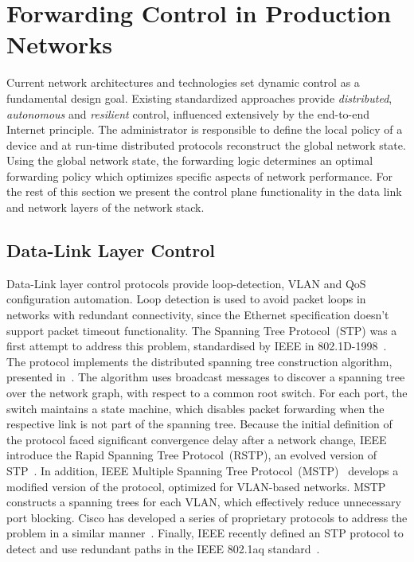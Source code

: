 \section{Forwarding Control in Production Networks} \label{sec:background:netcontrol}

Current network architectures and technologies set dynamic control as a
fundamental design goal.  Existing standardized approaches provide
\textit{distributed}, \textit{autonomous} and \textit{resilient} control,
influenced extensively by the end-to-end Internet principle. The administrator
is responsible to define the local policy of a device and at run-time
distributed protocols reconstruct the global network state.  Using the global
network state, the forwarding logic determines an optimal forwarding policy
which optimizes specific aspects of network performance.  For the rest of this
section we present the control plane functionality in the data link and network
layers of the network stack. 

\subsection{Data-Link Layer Control}

Data-Link layer control protocols provide loop-detection, VLAN and QoS
configuration automation. Loop detection is used to avoid packet loops in
networks with redundant connectivity, since the Ethernet specification doesn't
support packet timeout functionality.  The Spanning Tree Protocol~(STP) was a
first attempt to address this problem, standardised by IEEE in
802.1D-1998~. The protocol implements the distributed
spanning tree construction algorithm, presented in~. The
algorithm uses broadcast messages to discover a spanning tree over the network
graph, with respect to a common root switch. For each port, the switch maintains
a state machine, which disables packet forwarding when the respective link is
not part of the spanning tree.  Because the initial definition of the protocol
faced significant convergence delay after a network change, IEEE introduce the
Rapid Spanning Tree Protocol~(RSTP), an evolved version of
STP~.  In addition,  IEEE Multiple Spanning Tree
Protocol~(MSTP)~ develops a modified version of the protocol,
optimized for VLAN-based networks. MSTP constructs a spanning trees for each
VLAN, which effectively  reduce unnecessary port blocking. Cisco has developed a
series of proprietary protocols to address the problem in a similar
manner~.  Finally, IEEE recently defined an STP protocol to
detect and use redundant paths in the IEEE 802.1aq standard~.

